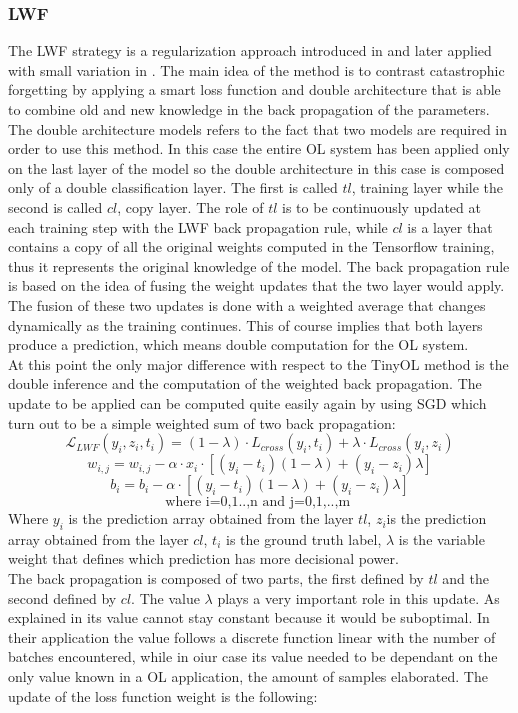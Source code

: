 \documentclass[12pt]{report}
\begin{document}
\subsubsection{LWF}
The LWF strategy is a regularization approach introduced in \autocite{li2017learning} and later applied with small variation in \autocite{maltoni2019continuous}. The main idea of the method is to contrast catastrophic forgetting by applying a smart loss function and double architecture that is able to combine old and new knowledge in the back propagation of the parameters. The double architecture models refers to the fact that two models are required in order to use this method. In this case the entire OL system has been applied only on the last layer of the model so the double architecture in this case is composed only of a double classification layer. The first is called $tl$, training layer while the second is called $cl$, copy layer. The role of $tl$ is to be continuously updated at each training step with the LWF back propagation rule, while $cl$ is a layer that contains a copy of all the original weights computed in the Tensorflow training, thus it represents the original knowledge of the model. The back propagation rule is based on the idea of fusing the weight updates that the two layer would apply. The fusion of these two updates is done with a weighted average that changes dynamically as the training continues. This of course implies that both layers produce a prediction, which means double computation for the OL system.\\
At this point the only major difference with respect to the TinyOL method is the double inference and the computation of the weighted back propagation. The update to be applied can be computed quite easily again by using SGD which turn out to be a simple weighted sum of two back propagation:
%
\[    \mathcal{L}_{LWF} ( y_i, z_i, t_i) =  (1-\lambda) \cdot{L}_{cross}(y_i, t_i) + \lambda \cdot{L}_{cross}(y_i, z_i) \]
\[ w_{i,j} = w_{i,j} - \alpha \cdot x_i \cdot [ (y_i - t_i)(1-\lambda) + (y_i - z_i)\lambda]  \]
\[ b_i = b_i - \alpha \cdot [ (y_i - t_i)(1-\lambda) + (y_i - z_i)\lambda] \]
\[ \text{where i=0,1..,n  and  j=0,1,..,m } \]
%
Where $y_i$ is the prediction array obtained from the layer $tl$, $z_i$is the prediction array obtained from the layer $cl$, $t_i$ is the ground truth label, $\lambda$ is the variable weight that defines which prediction has more decisional power. \\
The back propagation is composed of two parts, the first defined by $tl$ and the second defined by $cl$. The value $\lambda$ plays a very important role in this update. As explained in \autocite{maltoni2019continuous} its value cannot stay constant because it would be suboptimal. In their application the value follows a discrete function linear with the number of batches encountered, while in oiur case its value needed to be dependant on the only value known in a OL application, the amount of samples elaborated. The update of the loss function weight is the following:
\end{document}
